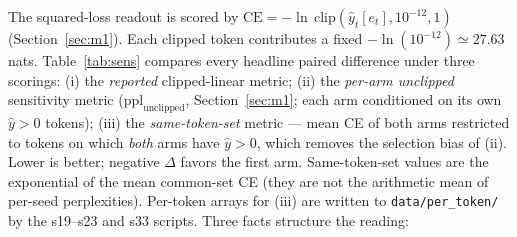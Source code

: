 \documentclass[preprint,12pt]{elsarticle}
\begin{document}
The squared-loss readout is scored by
$\mathrm{CE}=-\ln\,\mathrm{clip}(\hat y_t[e_t],10^{-12},1)$
(Section~\ref{sec:m1}). Each clipped token contributes a fixed
$-\ln(10^{-12})\simeq27.63$ nats. Table~\ref{tab:sens} compares every
headline paired difference under three scorings:
(i) the \emph{reported} clipped-linear metric;
(ii) the \emph{per-arm unclipped} sensitivity metric
($\mathrm{ppl}_{\mathrm{unclipped}}$, Section~\ref{sec:m1}; each arm
conditioned on its own $\hat y>0$ tokens);
(iii) the \emph{same-token-set} metric --- mean CE of both arms
restricted to tokens on which \emph{both} arms have $\hat y>0$, which
removes the selection bias of (ii).
Lower is better; negative $\Delta$ favors the first arm.
Same-token-set values are the exponential of the mean common-set CE
(they are not the arithmetic mean of per-seed perplexities).
Per-token arrays for (iii) are written to
\texttt{data/per\_token/} by the s19--s23 and s33 scripts.
Three facts structure the reading:
\end{document}
